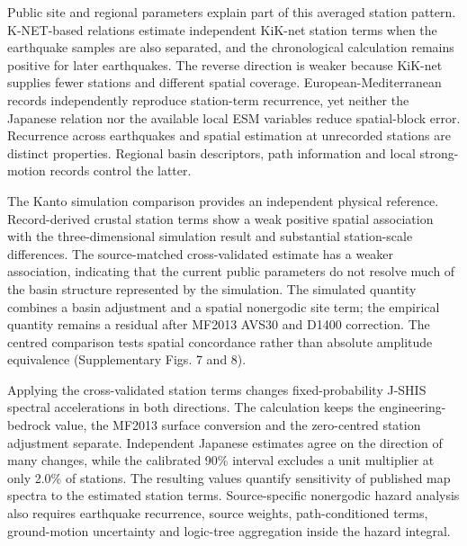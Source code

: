 \documentclass[11pt]{article}
\begin{document}
Public site and regional parameters explain part of this averaged station pattern. K-NET-based relations estimate independent KiK-net station terms when the earthquake samples are also separated, and the chronological calculation remains positive for later earthquakes. The reverse direction is weaker because KiK-net supplies fewer stations and different spatial coverage. European-Mediterranean records independently reproduce station-term recurrence, yet neither the Japanese relation nor the available local ESM variables reduce spatial-block error. Recurrence across earthquakes and spatial estimation at unrecorded stations are distinct properties. Regional basin descriptors, path information and local strong-motion records control the latter.

The Kanto simulation comparison provides an independent physical reference. Record-derived crustal station terms show a weak positive spatial association with the three-dimensional simulation result and substantial station-scale differences. The source-matched cross-validated estimate has a weaker association, indicating that the current public parameters do not resolve much of the basin structure represented by the simulation. The simulated quantity combines a basin adjustment and a spatial nonergodic site term; the empirical quantity remains a residual after MF2013 AVS30 and D1400 correction. The centred comparison tests spatial concordance rather than absolute amplitude equivalence (Supplementary Figs. 7 and 8).

Applying the cross-validated station terms changes fixed-probability J-SHIS spectral accelerations in both directions. The calculation keeps the engineering-bedrock value, the MF2013 surface conversion and the zero-centred station adjustment separate. Independent Japanese estimates agree on the direction of many changes, while the calibrated 90\% interval excludes a unit multiplier at only 2.0\% of stations. The resulting values quantify sensitivity of published map spectra to the estimated station terms. Source-specific nonergodic hazard analysis also requires earthquake recurrence, source weights, path-conditioned terms, ground-motion uncertainty and logic-tree aggregation inside the hazard integral\cite{abrahamson2019,cornell1968,mcguire1995,azuma2013,fujiwara2013,fujiwara2023,erc2022}.
\end{document}
